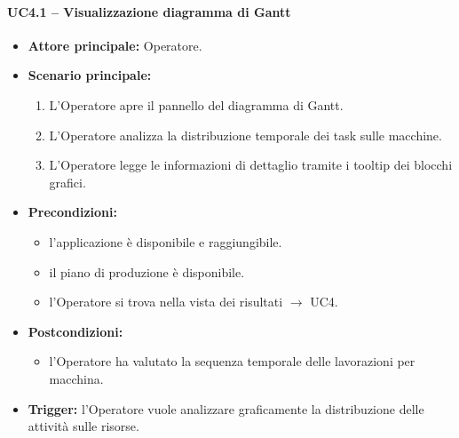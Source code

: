\paragraph{UC4.1 -- Visualizzazione diagramma di Gantt}
\begin{itemize}
    \item \textbf{Attore principale:} Operatore.
    \item \textbf{Scenario principale:}
    \begin{enumerate}
        \item L'Operatore apre il pannello del diagramma di Gantt.
        \item L'Operatore analizza la distribuzione temporale dei task sulle macchine.
        \item L'Operatore legge le informazioni di dettaglio tramite i tooltip dei blocchi grafici.
    \end{enumerate}
    \item \textbf{Precondizioni:}
    \begin{itemize}
        \item l'applicazione è disponibile e raggiungibile.
        \item il piano di produzione è disponibile.
        \item l'Operatore si trova nella vista dei risultati $\rightarrow$ UC4.
    \end{itemize}
    \item \textbf{Postcondizioni:}
    \begin{itemize}
        \item l'Operatore ha valutato la sequenza temporale delle lavorazioni per macchina.
    \end{itemize}
    \item \textbf{Trigger:} l'Operatore vuole analizzare graficamente la distribuzione delle attività sulle risorse.
\end{itemize}

